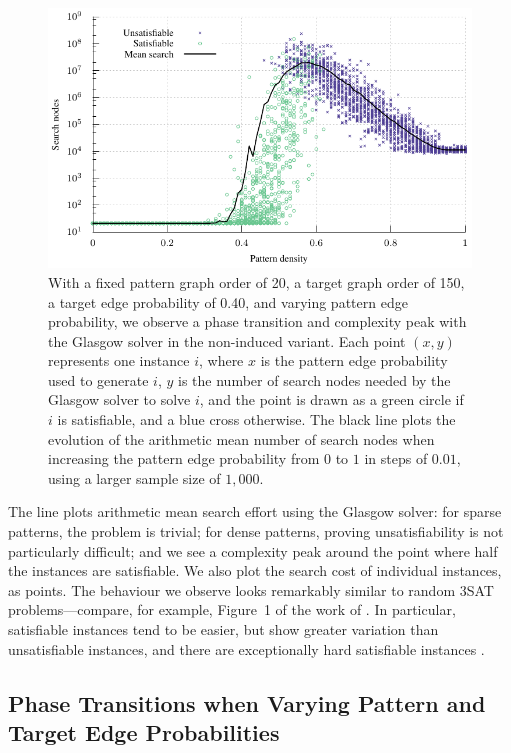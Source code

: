\documentclass[twoside,11pt]{article}
\begin{document}
\begin{figure}[t]
    \centering
    \includegraphics*{plots/phase-transition.pdf}

    \caption{With a fixed pattern graph order of 20, a target graph order of 150, a target edge
    probability of 0.40, and varying pattern edge probability, we observe a phase transition and
    complexity peak with the Glasgow solver in the non-induced variant. Each point $(x, y)$
    represents one instance $i$, where $x$ is the pattern edge probability used to generate $i$, $y$
    is the number of search nodes needed by the Glasgow solver to solve $i$, and the point is drawn
    as a green circle if $i$ is satisfiable, and a blue cross otherwise. The black line plots the
    evolution of the arithmetic mean number of search nodes when increasing the pattern edge probability from
    $0$ to $1$ in steps of $0.01$, using a larger sample size of $1,000$.}
    \label{figure:phase-transition}
\end{figure}

The line plots arithmetic mean search effort using the Glasgow solver: for sparse patterns, the problem is
trivial; for dense patterns, proving unsatisfiability is not particularly difficult; and we see a
complexity peak around the point where half the instances are satisfiable.  We also plot the search
cost of individual instances, as points. The behaviour we observe looks remarkably similar to random
3SAT problems---compare, for example, Figure~1 of the work of
. In particular, satisfiable instances tend to be
easier, but show greater variation than unsatisfiable instances, and there are exceptionally hard
satisfiable instances \cite{DBLP:conf/cp/SmithG97}.

\subsection{Phase Transitions when Varying Pattern and Target Edge Probabilities}
\end{document}
